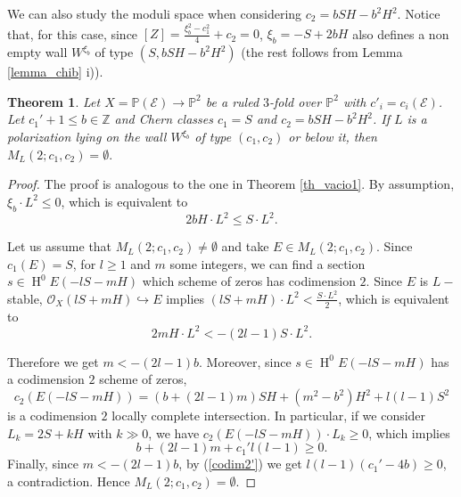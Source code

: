 \documentclass[11pt,twoside]{amsart}
\newtheorem{theorem}{Theorem}[section]
\theoremstyle{definition}
\newcommand{\Ho}{\operatorname{H}}
\begin{document}
We can also study the moduli space when considering  $c_2=bSH-b^2H^2$.
Notice that, for this case, since $[Z]=\frac{\xi_b^2-{c_1^2}}{4}+c_2=0$, $\xi_b=-S+2bH$ also defines a non empty wall $W^{\xi_b}$ of type $(S,bSH-b^2H^2)$ (the rest follows from Lemma \ref{lemma_chib} i)).



\begin{theorem}
       Let $X=\mathbb{P}(\mathcal{E})\rightarrow\mathbb{P}^2$ be a ruled $3$-fold over $\mathbb{P}^2$ with $c'_i=c_i(\mathcal{E})$.  Let  $c_1'+1\leq b\in\mathbb{Z}$ and Chern classes $c_1=S$ and $c_2=bSH-b^2H^2$.
   If $L$ is a polarization lying on the wall $W^{\xi_b}$ of type $(c_1,c_2)$ or below it, then $M_L(2;c_1,c_2)=\emptyset.$%
\end{theorem}
\begin{proof}
The proof is analogous to the one in Theorem \ref{th_vacio1}.
By assumption, $\xi_{b}\cdot L^2\leq0$, which is equivalent to 
\begin{equation}
    2b H\cdot L^2\leq S\cdot L^2.
\end{equation}

    Let us assume that $M_{L}(2;c_1,c_2)\neq \emptyset$ and take $E\in M_{L}(2;c_1,c_2)$. 
Since $c_1(E)=S$, for $l\geq1$ and $m$ some integers, we can find a section $s\in\Ho^0E(-lS-mH)$ which scheme of zeros has codimension $2$.
    Since $E$ is $L-$stable, $\mathcal{O}_X(lS+mH)\hookrightarrow E$ implies $(lS+mH)\cdot L^2<\frac{S\cdot L^2}{2}$, which is equivalent to 
    \begin{equation}
        2m H\cdot L^2<-(2l-1)S\cdot L^2.
    \end{equation}

Therefore we get
$m<-(2l-1)b$. Moreover, since $s\in\Ho^0E(-lS-mH)$  has a codimension $2$ scheme of zeros, $$c_2(E(-lS-mH))= (b+(2l-1)m)SH+(m^2-b^2)H^2+l(l-1)S^2$$ is a codimension $2$ locally complete intersection. In particular, if we consider $L_k=2S+k H$ with $k\gg0$, we have $c_2(E(-lS-mH))\cdot L_k\geq0$, which implies
    \begin{equation}
    \label{codim2'}
        b+(2l-1)m+c_1'l(l-1)\geq0.
    \end{equation}
Finally, since $m<-(2l-1)b$, by (\ref{codim2'}) we get $l(l-1)(c_1'-4b)\geq0$, a contradiction. Hence $M_{L}(2;c_1,c_2)=\emptyset$.



\end{proof}
\end{document}
